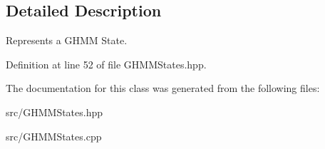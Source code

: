 \subsection{Detailed Description}
Represents a G\+H\+MM State. 

Definition at line 52 of file G\+H\+M\+M\+States.\+hpp.



The documentation for this class was generated from the following files\+:\begin{DoxyCompactItemize}
\item 
src/G\+H\+M\+M\+States.\+hpp\item 
src/G\+H\+M\+M\+States.\+cpp\end{DoxyCompactItemize}
